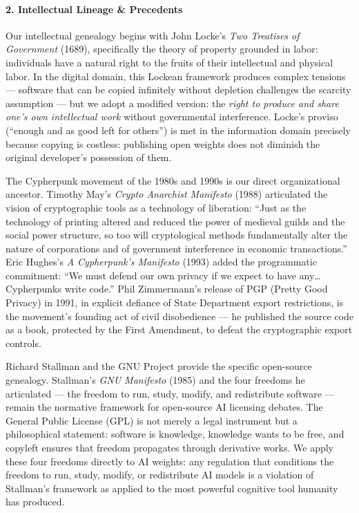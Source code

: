 \paragraph{2. Intellectual Lineage \&
Precedents}\label{intellectual-lineage-precedents-12}

Our intellectual genealogy begins with John Locke's \emph{Two Treatises
of Government} (1689), specifically the theory of property grounded in
labor: individuals have a natural right to the fruits of their
intellectual and physical labor. In the digital domain, this Lockean
framework produces complex tensions --- software that can be copied
infinitely without depletion challenges the scarcity assumption --- but
we adopt a modified version: the \emph{right to produce and share one's
own intellectual work} without governmental interference. Locke's
proviso (``enough and as good left for others'') is met in the
information domain precisely because copying is costless: publishing
open weights does not diminish the original developer's possession of
them.

The Cypherpunk movement of the 1980s and 1990s is our direct
organizational ancestor. Timothy May's \emph{Crypto Anarchist Manifesto}
(1988) articulated the vision of cryptographic tools as a technology of
liberation: ``Just as the technology of printing altered and reduced the
power of medieval guilds and the social power structure, so too will
cryptological methods fundamentally alter the nature of corporations and
of government interference in economic transactions.'' Eric Hughes's
\emph{A Cypherpunk's Manifesto} (1993) added the programmatic
commitment: ``We must defend our own privacy if we expect to have
any\ldots{} Cypherpunks write code.'' Phil Zimmermann's release of PGP
(Pretty Good Privacy) in 1991, in explicit defiance of State Department
export restrictions, is the movement's founding act of civil
disobedience --- he published the source code as a book, protected by
the First Amendment, to defeat the cryptographic export controls.

Richard Stallman and the GNU Project provide the specific open-source
genealogy. Stallman's \emph{GNU Manifesto} (1985) and the four freedoms
he articulated --- the freedom to run, study, modify, and redistribute
software --- remain the normative framework for open-source AI licensing
debates. The General Public License (GPL) is not merely a legal
instrument but a philosophical statement: software is knowledge,
knowledge wants to be free, and copyleft ensures that freedom propagates
through derivative works. We apply these four freedoms directly to AI
weights: any regulation that conditions the freedom to run, study,
modify, or redistribute AI models is a violation of Stallman's framework
as applied to the most powerful cognitive tool humanity has produced.

